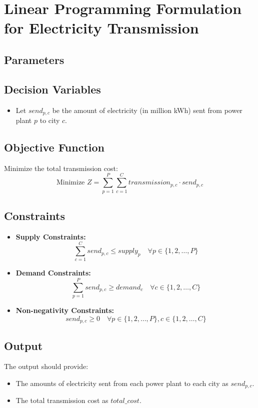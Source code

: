 \documentclass{article}
\begin{document}
\section*{Linear Programming Formulation for Electricity Transmission}

\subsection*{Parameters}

\subsection*{Decision Variables}
\begin{itemize}
    \item Let $send_{p,c}$ be the amount of electricity (in million kWh) sent from power plant $p$ to city $c$.
\end{itemize}

\subsection*{Objective Function}
Minimize the total transmission cost:
\[
\text{Minimize } Z = \sum_{p=1}^{P}\sum_{c=1}^{C} transmission_{p,c} \cdot send_{p,c}
\]

\subsection*{Constraints}
\begin{itemize}
    \item \textbf{Supply Constraints:}
    \[
    \sum_{c=1}^{C} send_{p,c} \leq supply_p \quad \forall p \in \{1, 2, \ldots, P\}
    \]

    \item \textbf{Demand Constraints:}
    \[
    \sum_{p=1}^{P} send_{p,c} \geq demand_c \quad \forall c \in \{1, 2, \ldots, C\}
    \]

    \item \textbf{Non-negativity Constraints:}
    \[
    send_{p,c} \geq 0 \quad \forall p \in \{1, 2, \ldots, P\}, c \in \{1, 2, \ldots, C\}
    \]
\end{itemize}

\subsection*{Output}
The output should provide:
\begin{itemize}
    \item The amounts of electricity sent from each power plant to each city as $send_{p,c}$.
    \item The total transmission cost as $total\_cost$.
\end{itemize}
\end{document}
